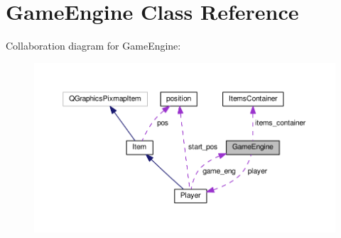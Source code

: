 \hypertarget{class_game_engine}{}\section{Game\+Engine Class Reference}
\label{class_game_engine}


Collaboration diagram for Game\+Engine\+:
\nopagebreak
\begin{figure}[H]
\begin{center}
\leavevmode
\includegraphics[width=350pt]{class_game_engine__coll__graph}
\end{center}
\end{figure}
